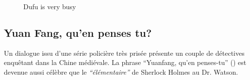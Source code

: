 \begin{figure}[ht]
    \caption{
      Dufu is very busy 
    }
\end{figure}

\clearpage

\subsection{Yuan Fang, qu'en penses tu?}

Un dialogue issu d'une série policière très prisée présente un couple de détectives enquêtant dans la Chine médiévale. La phrase ``Yuanfang, qu'en penses-tu'' () est devenue aussi célèbre que le \textit{``élémentaire''} de Sherlock Holmes au Dr. Watson. 

